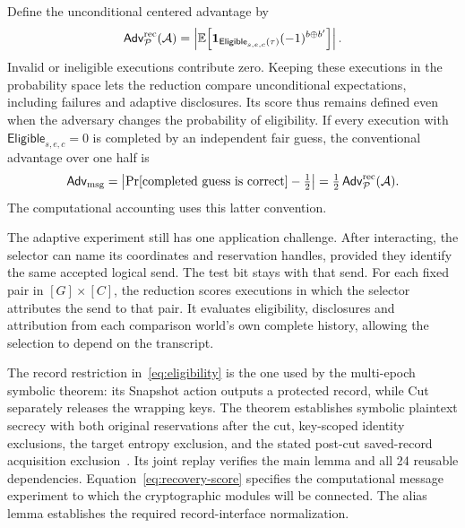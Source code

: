 Define the unconditional centered advantage by
\begin{equation}
 \mathsf{Adv}^{\rm rec}_{\mathcal P}(\mathcal A)
   =
 \left|
   \mathbb E\!\left[
    \mathbf 1_{\mathsf{Eligible}_{s,e,c}(\tau)}
                       (-1)^{b\oplus b'}\right]
 \right|.
 \label{eq:recovery-score}
\end{equation}
Invalid or ineligible executions contribute zero. Keeping these executions
in the probability space lets the reduction compare unconditional
expectations, including failures and adaptive disclosures. Its score thus
remains defined even when the adversary changes the probability of eligibility.
If every execution with $\mathsf{Eligible}_{s,e,c}=0$ is completed by an
independent fair guess, the conventional advantage over one half is
\[
 \mathsf{Adv}_{\rm msg}
   =\left|\Pr[\text{completed guess is correct}]-\tfrac12\right|
   =\tfrac12\,\mathsf{Adv}^{\rm rec}_{\mathcal P}(\mathcal A).
\]
The computational accounting uses this latter convention.

The adaptive experiment still has one application challenge. After
interacting, the selector can name its coordinates and reservation
handles, provided they identify the same accepted logical send. The
test bit stays with that send. For each fixed pair in $[G]\times[C]$,
the reduction scores executions in which the selector attributes the
send to that pair. It evaluates eligibility, disclosures and attribution
from each comparison world's own complete history, allowing the
selection to depend on the transcript.

The record restriction in~\eqref{eq:eligibility} is the one used by the
multi-epoch symbolic theorem: its \textsf{Snapshot} action outputs
a protected record, while \textsf{Cut} separately releases the wrapping keys.
The theorem establishes symbolic plaintext secrecy with both original
reservations after the cut, key-scoped identity exclusions, the target
entropy exclusion, and the stated post-cut saved-record acquisition
exclusion~\cite{qperiaptSymbolic2026}.  Its joint replay verifies the main
lemma and all 24 reusable dependencies.  Equation~\eqref{eq:recovery-score}
specifies the computational message experiment to which the cryptographic
modules will be connected. The alias lemma establishes the required
record-interface normalization.

